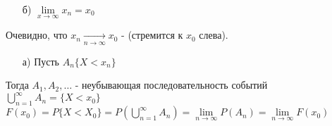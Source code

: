 \begin{enumerate}
\begin{enumerate}
\begin{enumerate}
			\item[б)]
			$\lim\limits_{x \to \infty} x_n = x_0$ \\
		\end{enumerate}
		Очевидно, что $x_n \underset{n \to \infty}{\rightarrow} x_0$ - (стремится к $x_0$ слева).
		\begin{enumerate}
			\item[а)] 
			Пусть $A_n\{X < x_n\}$ \\
		\end{enumerate}
		Тогда $A_1, A_2, \ldots$ - неубывающая последовательность событий $\bigcup\limits_{n = 1}^{\infty} A_n = \{X < x_0\}$ \\
		$F(x_0) = P\{X<X_0\} = P\left(\bigcup\limits_{n = 1}^{\infty} A_n\right) = \lim\limits_{n \to \infty} P(A_n) = \lim\limits_{n \to \infty} F(x_0)$
	\end{enumerate}		
	
\end{enumerate}



























